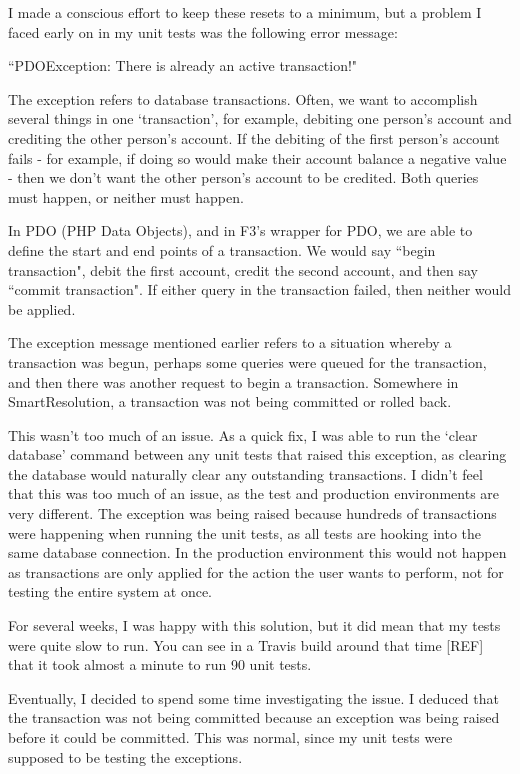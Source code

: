 I made a conscious effort to keep these resets to a minimum, but a problem I faced early on in my unit tests was the following error message:

``PDOException: There is already an active transaction!"

The exception refers to database transactions. Often, we want to accomplish several things in one `transaction', for example, debiting one person's account and crediting the other person's account. If the debiting of the first person's account fails - for example, if doing so would make their account balance a negative value - then we don't want the other person's account to be credited. Both queries must happen, or neither must happen.

In PDO (PHP Data Objects), and in F3's wrapper for PDO, we are able to define the start and end points of a transaction. We would say ``begin transaction", debit the first account, credit the second account, and then say ``commit transaction". If either query in the transaction failed, then neither would be applied.

The exception message mentioned earlier refers to a situation whereby a transaction was begun, perhaps some queries were queued for the transaction, and then there was another request to begin a transaction. Somewhere in SmartResolution, a transaction was not being committed or rolled back.

This wasn't too much of an issue. As a quick fix, I was able to run the `clear database' command between any unit tests that raised this exception, as clearing the database would naturally clear any outstanding transactions. I didn't feel that this was too much of an issue, as the test and production environments are very different. The exception was being raised because hundreds of transactions were happening when running the unit tests, as all tests are hooking into the same database connection. In the production environment this would not happen as transactions are only applied for the action the user wants to perform, not for testing the entire system at once.

For several weeks, I was happy with this solution, but it did mean that my tests were quite slow to run. You can see in a Travis build around that time [REF] that it took almost a minute to run 90 unit tests. %

Eventually, I decided to spend some time investigating the issue. I deduced that the transaction was not being committed because an exception was being raised before it could be committed. This was normal, since my unit tests were supposed to be testing the exceptions.


